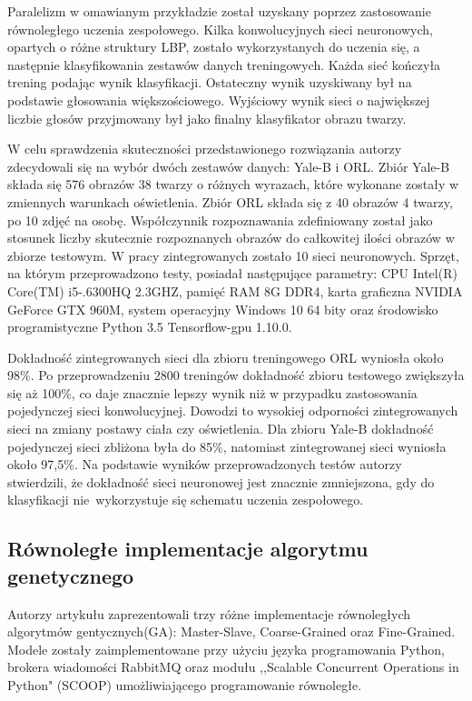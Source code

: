 \documentclass[12pt]{article}
\begin{document}
Paralelizm w omawianym przykładzie został uzyskany poprzez zastosowanie równoległego uczenia zespołowego. Kilka konwolucyjnych sieci neuronowych, opartych o różne
struktury LBP, zostało wykorzystanych do uczenia się, a następnie klasyfikowania zestawów danych treningowych. Każda sieć kończyła trening podając wynik klasyfikacji. Ostateczny
wynik uzyskiwany był na podstawie głosowania większościowego. Wyjściowy wynik sieci o największej liczbie głosów przyjmowany był jako finalny klasyfikator obrazu twarzy.

W celu sprawdzenia skuteczności przedstawionego rozwiązania autorzy zdecydowali się na wybór dwóch zestawów danych: Yale-B i ORL. Zbiór Yale-B składa się 576 obrazów 38 twarzy
o różnych wyrazach, które wykonane zostały w zmiennych warunkach oświetlenia. Zbiór ORL składa się z 40 obrazów 4 twarzy, po 10 zdjęć na osobę. Współczynnik rozpoznawania
zdefiniowany został jako stosunek liczby skutecznie rozpoznanych obrazów do całkowitej ilości obrazów w zbiorze testowym. W pracy zintegrowanych zostało 10 sieci neuronowych.
Sprzęt, na którym przeprowadzono testy, posiadał następujące parametry: CPU Intel(R) Core(TM) i5-.6300HQ 2.3GHZ, pamięć RAM 8G DDR4, karta graficzna NVIDIA GeForce GTX 960M,
system operacyjny Windows 10 64 bity oraz środowisko programistyczne Python 3.5 Tensorflow-gpu 1.10.0.

Dokładność zintegrowanych sieci dla zbioru treningowego ORL wyniosła około 98\%. Po przeprowadzeniu 2800 treningów dokładność zbioru testowego zwiększyła się aż 100\%, co daje
znacznie lepszy wynik niż w przypadku zastosowania pojedynczej sieci konwolucyjnej. Dowodzi to wysokiej odporności zintegrowanych sieci na zmiany postawy ciała czy oświetlenia.
Dla zbioru Yale-B dokładność pojedynczej sieci zbliżona była do 85\%, natomiast zintegrowanej sieci wyniosła około 97,5\%. Na podstawie wyników przeprowadzonych testów
autorzy stwierdzili, że dokładność sieci neuronowej jest znacznie zmniejszona, gdy do klasyfikacji nie~wykorzystuje się schematu uczenia zespołowego.

\subsection{Równoległe implementacje algorytmu genetycznego}

Autorzy artykułu \cite{parallelized-genetic-algorithms} zaprezentowali trzy różne implementacje równoległych algorytmów gentycznych(GA):
Master-Slave, Coarse-Grained oraz Fine-Grained. Modele zostały zaimplementowane przy użyciu języka programowania Python, brokera wiadomości RabbitMQ
oraz modułu ,,Scalable Concurrent Operations in Python" (SCOOP) umożliwiającego programowanie równoległe.
\end{document}
